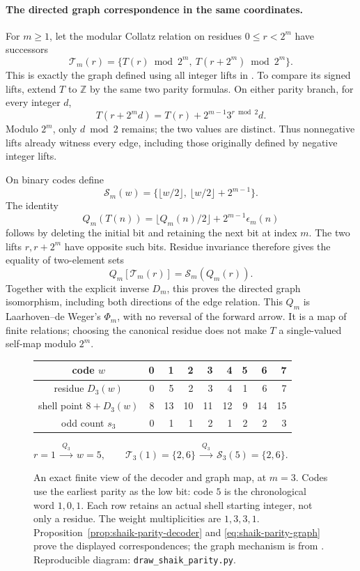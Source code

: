 \documentclass[11pt]{article}
\theoremstyle{remark}\newtheorem{remark}[proposition]{Remark}
\begin{document}
\paragraph{The directed graph correspondence in the same coordinates.}
For \(m\ge1\), let the modular Collatz relation on residues
\(0\le r<2^m\) have successors
\[
 \mathcal T_m(r)=
 \{T(r)\bmod2^m,\ T(r+2^m)\bmod2^m\}.
\]
This is exactly the graph defined using all integer lifts in
\cite[Section~2]{LaarhovenDeWeger2012}. To compare its signed lifts,
extend \(T\) to \(\mathbb Z\) by the same two parity formulas.
On either parity branch, for every integer \(d\),
\[
 T(r+2^m d)=T(r)+2^{m-1}3^{r\bmod2}d .
\]
Modulo \(2^m\), only \(d\bmod2\) remains; the two values are distinct.
Thus nonnegative lifts already witness every edge, including those
originally defined by negative integer lifts.

On binary codes define
\[
 \mathcal S_m(w)=
 \{\lfloor w/2\rfloor,\ \lfloor w/2\rfloor+2^{m-1}\}.
\]
The identity
\begin{equation}\label{eq:shaik-parity-graph}
 Q_m(T(n))=\lfloor Q_m(n)/2\rfloor
                 +2^{m-1}\epsilon_m(n)
\end{equation}
follows by deleting the initial bit and retaining the next bit at
index \(m\). The two lifts \(r,r+2^m\) have opposite such bits.
Residue invariance therefore gives the equality of two-element sets
\[
 Q_m[\mathcal T_m(r)]=\mathcal S_m(Q_m(r)).
\]
Together with the explicit inverse \(D_m\), this proves the directed
graph isomorphism, including both directions of the edge relation.
This \(Q_m\) is Laarhoven--de Weger's \(\Phi_m\), with no reversal of
the forward arrow. It is a map of finite relations; choosing the
canonical residue does not make \(T\) a single-valued self-map
modulo \(2^m\).

\begin{figure}[ht]
\centering
\begin{tabular}{c|rrrrrrrr}
code \(w\)&0&1&2&3&4&5&6&7\\ \hline
residue \(D_3(w)\)&0&5&2&3&4&1&6&7\\
shell point \(8+D_3(w)\)&8&13&10&11&12&9&14&15\\
odd count \(s_3\)&0&1&1&2&1&2&2&3
\end{tabular}

\smallskip
\(r=1 \ \xrightarrow{\ Q_3\ }\ w=5,\qquad
 \mathcal T_3(1)=\{2,6\}
 \ \xrightarrow{\ Q_3\ }\ \mathcal S_3(5)=\{2,6\}.\)
\caption{An exact finite view of the decoder and graph map, at \(m=3\).
Codes use the earliest parity as the low bit: code \(5\) is the
chronological word \(1,0,1\). Each row retains an actual shell starting
integer, not only a residue. The weight multiplicities are \(1,3,3,1\).
Proposition~\ref{prop:shaik-parity-decoder} and
\eqref{eq:shaik-parity-graph} prove the displayed correspondences;
the graph mechanism is from
\cite[Section~2]{LaarhovenDeWeger2012}. Reproducible diagram:
\texttt{draw\_shaik\_parity.py}.}
\label{fig:shaik-parity}
\end{figure}
\end{document}
